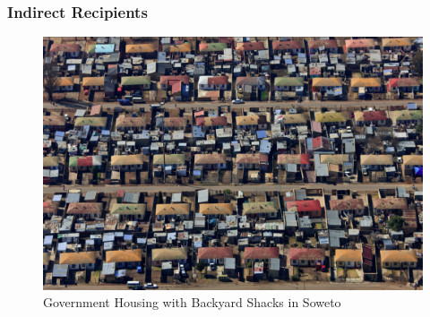 \documentclass[aspectratio=32]{beamer}
\begin{document}

\begin{frame}
\frametitle{Indirect Recipients}
\centering

\begin{figure}
 \includegraphics[scale=.25]{figures/shacks.jpg} 
 \caption{Government Housing with Backyard Shacks in Soweto}
\end{figure}

\end{frame}

\end{document}
